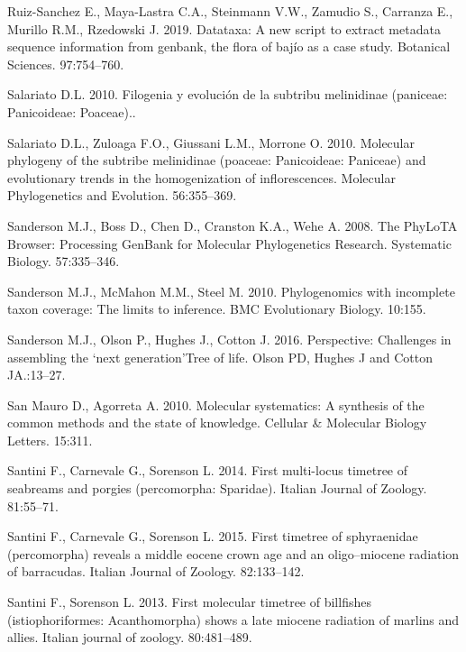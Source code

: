 \documentclass[]{article}
\begin{document}
\leavevmode\hypertarget{ref-ruiz2019datataxa}{}%
Ruiz-Sanchez E., Maya-Lastra C.A., Steinmann V.W., Zamudio S., Carranza E., Murillo R.M., Rzedowski J. 2019. Datataxa: A new script to extract metadata sequence information from genbank, the flora of bajío as a case study. Botanical Sciences. 97:754--760.

\leavevmode\hypertarget{ref-salariato2010filogenia}{}%
Salariato D.L. 2010. Filogenia y evolución de la subtribu melinidinae (paniceae: Panicoideae: Poaceae)..

\leavevmode\hypertarget{ref-salariato2010molecular}{}%
Salariato D.L., Zuloaga F.O., Giussani L.M., Morrone O. 2010. Molecular phylogeny of the subtribe melinidinae (poaceae: Panicoideae: Paniceae) and evolutionary trends in the homogenization of inflorescences. Molecular Phylogenetics and Evolution. 56:355--369.

\leavevmode\hypertarget{ref-sanderson2008phylota}{}%
Sanderson M.J., Boss D., Chen D., Cranston K.A., Wehe A. 2008. The PhyLoTA Browser: Processing GenBank for Molecular Phylogenetics Research. Systematic Biology. 57:335--346.

\leavevmode\hypertarget{ref-sanderson2010phylogenomics}{}%
Sanderson M.J., McMahon M.M., Steel M. 2010. Phylogenomics with incomplete taxon coverage: The limits to inference. BMC Evolutionary Biology. 10:155.

\leavevmode\hypertarget{ref-sanderson2016perspective}{}%
Sanderson M.J., Olson P., Hughes J., Cotton J. 2016. Perspective: Challenges in assembling the `next generation'Tree of life. Olson PD, Hughes J and Cotton JA.:13--27.

\leavevmode\hypertarget{ref-san2010molecular}{}%
San Mauro D., Agorreta A. 2010. Molecular systematics: A synthesis of the common methods and the state of knowledge. Cellular \& Molecular Biology Letters. 15:311.

\leavevmode\hypertarget{ref-santini2014first}{}%
Santini F., Carnevale G., Sorenson L. 2014. First multi-locus timetree of seabreams and porgies (percomorpha: Sparidae). Italian Journal of Zoology. 81:55--71.

\leavevmode\hypertarget{ref-santini2015first}{}%
Santini F., Carnevale G., Sorenson L. 2015. First timetree of sphyraenidae (percomorpha) reveals a middle eocene crown age and an oligo--miocene radiation of barracudas. Italian Journal of Zoology. 82:133--142.

\leavevmode\hypertarget{ref-santini2013first}{}%
Santini F., Sorenson L. 2013. First molecular timetree of billfishes (istiophoriformes: Acanthomorpha) shows a late miocene radiation of marlins and allies. Italian journal of zoology. 80:481--489.
\end{document}
